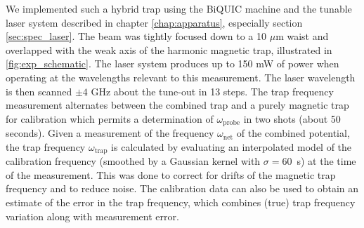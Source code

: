 	We implemented such a hybrid trap using the BiQUIC machine and the tunable laser system described in chapter \ref{chap:apparatus}, especially section \ref{sec:spec_laser}. 
	The beam was tightly focused down to a 10 $\mu$m waist and overlapped with the weak axis of the harmonic magnetic trap, illustrated in  \autoref{fig:exp_schematic}.
	The laser system produces up to 150 mW of power when operating at the wavelengths relevant to this measurement. 
	The laser wavelength is then scanned $\pm4$ GHz about the tune-out in 13 steps.	
	The trap frequency measurement alternates between the combined trap and a purely magnetic trap for calibration which permits a determination of $\omega_\mathrm{probe}$ in two shots (about 50 seconds). 
	Given a measurement of the frequency $\omega_\mathrm{net}$ of the combined potential, the trap frequency $\omega_\mathrm{trap}$ is calculated by evaluating an interpolated model of the calibration frequency (smoothed by a Gaussian kernel with $\sigma=60$~s) at the time of the measurement. 
	This was done to correct for drifts of the magnetic trap frequency and to reduce noise. 
	The calibration data can also be used to obtain an estimate of the error in the trap frequency, which combines (true) trap frequency variation along with measurement error. 

